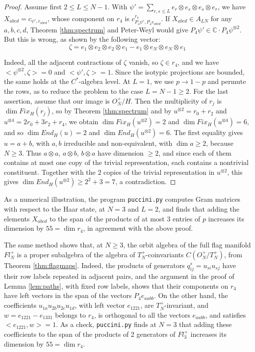 \documentclass[11pt]{article}
\theoremstyle{plain}
\begin{document}
\begin{proof}
Assume first $2\leq L\leq N-1$. With $\psi'=\sum_{r,s\leq L}e_r\otimes e_s\otimes e_s\otimes e_r$, we have $X_{abcd}=c_{\psi',e_{abcd}}$, whose component on $r_4$ is $c^{r_4}_{P_4\psi',P_4e_{abcd}}$. If $X_{abcd}\in A_{LN}$ for any $a,b,c,d$, Theorem \ref{thm:spectrum} and Peter-Weyl would give $P_4\psi'\in\mathbb C\cdot P_4\psi^{\otimes2}$. But this is wrong, as shown by the following vector:
$$\zeta=e_1\otimes e_2\otimes e_2\otimes e_1-e_1\otimes e_N\otimes e_N\otimes e_1$$

Indeed, all the adjacent contractions of $\zeta$ vanish, so $\zeta\in r_4$, and we have $<\psi^{\otimes 2},\zeta>=0$ and $<\psi',\zeta>=1$. Since the isotypic projections are bounded, the same holds at the $C^*$-algebra level. At $L=1$, we use $p\to1-p$ and permute the rows, as to reduce the problem to the case $L=N-1\geq2$. For the last assertion, assume that our image is $O_N^+/H$. Then the multiplicity of $r_j$ is $\dim Fix_H(r_j)$, so by Theorem \ref{thm:spectrum} and by $u^{\otimes2}=r_0+r_2$ and $u^{\otimes4}=2r_0+3r_2+r_4$, we obtain $\dim Fix_H(u^{\otimes2})=2$ and $\dim Fix_H(u^{\otimes4})=6$, and so $\dim End_H(u)=2$ and $\dim End_H(u^{\otimes2})=6$. The first equality gives $u=a+b$, with $a,b$ irreducible and non-equivalent, with $\dim a\geq2$, because $N\geq3$. Thus $a\otimes a$, $a\otimes b$, $b\otimes a$ have dimension $\geq2$, and since each of them contains at most one copy of the trivial representation, each contains a nontrivial constituent. Together with the 2 copies of the trivial representation in $u^{\otimes2}$, this gives $\dim End_H(u^{\otimes2})\geq2^2+3=7$, a contradiction.
\end{proof}

As a numerical illustration, the program {\tt puccini.py} computes Gram matrices with respect to the Haar state, at $N=3$ and $L=2$, and finds that adding the elements $X_{abcd}$ to the span of the products of at most 3 entries of $p$ increases its dimension by $55=\dim r_4$, in agreement with the above proof.

\bigskip

The same method shows that, at $N\geq3$, the orbit algebra of the full flag manifold $Fl^+_N$ is a proper subalgebra of the algebra of $T_N^+$-coinvariants $C(O_N^+/T_N^+)$, from Theorem \ref{thm:flagmaps}. Indeed, the products of generators $q^s_{ij}=u_{si}u_{sj}$ have their row labels repeated in adjacent pairs, and the argument in the proof of Lemma \ref{lem:paths}, with fixed row labels, shows that their components on $r_4$ have left vectors in the span of the vectors $P_4e_{aabb}$. On the other hand, the coefficients $u_{1a}u_{2b}u_{2c}u_{1d}$, with left vector $e_{1221}$, are $T_N^+$-invariant, and $w=e_{1221}-e_{1331}$ belongs to $r_4$, is orthogonal to all the vectors $e_{aabb}$, and satisfies $<e_{1221},w>=1$. As a check, {\tt puccini.py} finds at $N=3$ that adding these coefficients to the span of the products of 2 generators of $Fl^+_3$ increases its dimension by $55=\dim r_4$.
\end{document}
